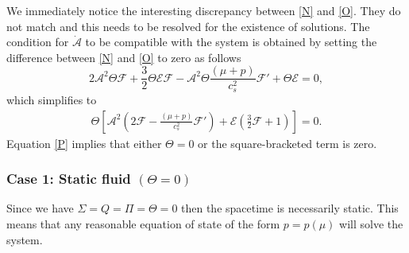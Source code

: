 \documentclass[abstract=on,notitlepage,superscriptaddress,nofootinbib,aps,showpacs,twocolumn,prd]{revtex4}
\newcommand{\0}{^{(0)}}
\newcommand{\1}{^{(1)}}
\newcommand{\2}{^{(2)}}
\newcommand{\3}{{}^{(3)}}
\begin{document}
We immediately notice the interesting discrepancy between \eqref{N} and \eqref{O}. They do not match and this needs to be resolved for the existence of solutions. The condition for $\dot{\mathcal{A}}$ to be compatible with the system is obtained by setting the difference between \eqref{N} and \eqref{O} to zero as follows
\begin{equation}
2\mathcal{A}^2\Theta\mathcal{F}+\frac{3}{2}\Theta\mathcal{E}\mathcal{F}-\mathcal{A}^2\Theta\frac{(\mu+p)}{c_s^2}\mathcal{F}'+\Theta\mathcal{E} = 0,
\end{equation}
which simplifies to
\begin{eqnarray}	
 \Theta\left[\mathcal{A}^2\left(2\mathcal{F}-\frac{(\mu+p)}{c_s^2}\mathcal{F}'\right)  +\mathcal{E}\left(\frac{3}{2}\mathcal{F}+1\right)\right] = 0. \label{P}
\end{eqnarray}
Equation \eqref{P} implies that either $\Theta = 0$ or the square-bracketed term is zero.


\subsubsection{Case 1: Static fluid $\left(\Theta = 0\right)$}
Since we have $\Sigma = Q =\Pi=\Theta = 0$ then the spacetime is necessarily static. This means that any reasonable equation of state of the form $p=p(\mu)$ will solve the system.

\end{document}

